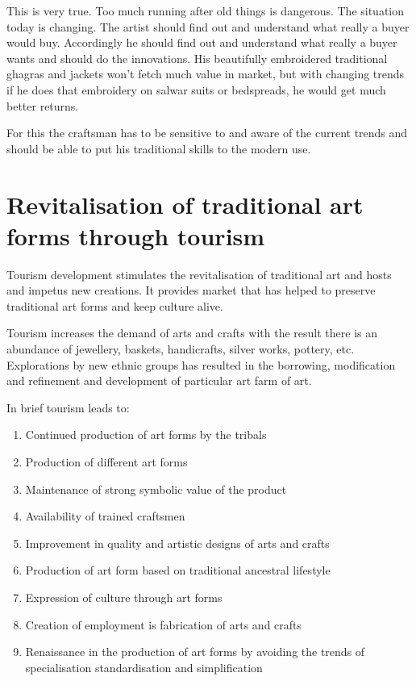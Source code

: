 This is very true. Too much running after old things is dangerous. The situation today is changing. The artist should find out and understand what really a buyer would buy. Accordingly he should find out and understand what really a buyer wants and should do the innovations. His beautifully embroidered traditional ghagras and jackets won't fetch much value in market, but with changing trends if he does that embroidery on salwar suits or bedspreads, he would get much better returns.

For this the craftsman has to be sensitive to and aware of the current trends and should be able to put his traditional skills to the modern use.


\section{Revitalisation of traditional art forms through tourism} %
\label{sec:rev}

Tourism development stimulates the revitalisation of traditional art and hosts and impetus new creations. It provides market that has helped to preserve traditional art forms and keep culture alive.

Tourism increases the demand of arts and crafts with the result there is an abundance of jewellery, baskets, handicrafts, silver works, pottery, etc. Explorations by new ethnic groups has resulted in the borrowing, modification and refinement and development of particular art farm of art.

In brief tourism leads to:

\begin{enumerate}
  \item Continued production of art forms by the tribals
  \item Production of different art forms
  \item Maintenance of strong symbolic value of the product
  \item Availability of trained craftsmen
  \item Improvement in quality and artistic designs of arts and crafts
  \item Production of art form based on traditional ancestral lifestyle
  \item Expression of culture through art forms
  \item Creation of employment is fabrication of arts and crafts
  \item Renaissance in the production of art forms by avoiding the trends of specialisation standardisation and simplification
\end{enumerate}


